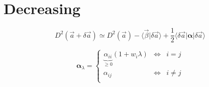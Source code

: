 \documentclass[aps,12pt]{revtex4}
\begin{document}
\section{Decreasing}

\begin{equation}
	 D^2(\vec{a} + \delta \vec{a}) \simeq 
	  D^2(\vec{a}) - \langle \vec{\beta} \vert \delta\vec{a} \rangle 
	  + \dfrac{1}{2} \langle \delta\vec{a} \vert \bm{\alpha}  \vert \delta\vec{a} \rangle 
\end{equation}


\begin{equation}
	\bm{\alpha}_\lambda =
	\left\lbrace
	\begin{array}{ccl}
	\underbrace{\alpha_{ii}}_{\geq0}(1+w_i\lambda) & \iff & i=j\\
	\alpha_{ij} & \iff & i \not= j \\
	\end{array}
	\right.
\end{equation}
\end{document}
